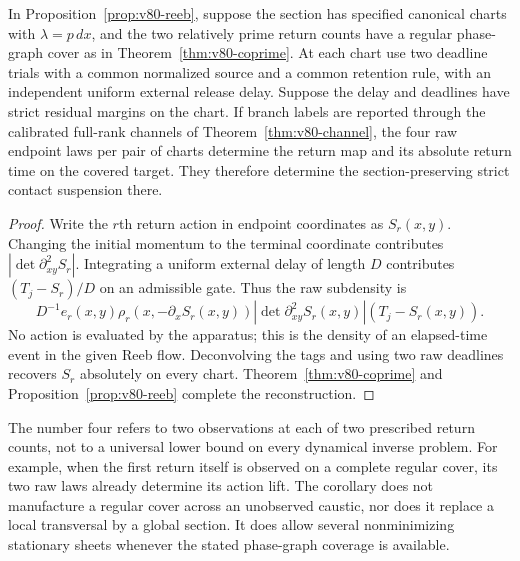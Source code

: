 \begin{corollary}
\label{cor:v80-four-intrinsic}
In Proposition~\ref{prop:v80-reeb}, suppose the section has specified
canonical charts with $\lambda=p\,dx$, and the two relatively prime
return counts have a regular phase-graph cover as in
Theorem~\ref{thm:v80-coprime}.  At each chart use two deadline trials
with a common normalized source and a common retention rule, with an
independent uniform external release delay.  Suppose the delay and
deadlines have strict residual margins on the chart.  If branch labels
are reported through the calibrated full-rank channels of
Theorem~\ref{thm:v80-channel}, the four raw endpoint laws per pair of
charts determine the return map and its absolute return time on the
covered target.  They therefore determine the section-preserving strict
contact suspension there.
\end{corollary}
\begin{proof}
Write the $r$th return action in endpoint coordinates as $S_r(x,y)$.
Changing the initial momentum to the terminal coordinate contributes
$|\det\partial_{xy}^2S_r|$.  Integrating a uniform external delay of
length $D$ contributes $(T_j-S_r)/D$ on an admissible gate.  Thus the
raw subdensity is
\[
 D^{-1}e_r(x,y)\rho_r(x,-\partial_xS_r(x,y))
           |\det\partial_{xy}^2S_r(x,y)|(T_j-S_r(x,y)).
\]
No action is evaluated by the apparatus; this is the density of an
elapsed-time event in the given Reeb flow.  Deconvolving the tags and
using two raw deadlines recovers $S_r$ absolutely on every chart.
Theorem~\ref{thm:v80-coprime} and Proposition~\ref{prop:v80-reeb}
complete the reconstruction.
\end{proof}

The number four refers to two observations at each of two prescribed
return counts, not to a universal lower bound on every dynamical inverse
problem.  For example, when the first return itself is observed on a
complete regular cover, its two raw laws already determine its action
lift.  The corollary does not manufacture a regular cover across an
unobserved caustic, nor does it replace a local transversal by a global
section.  It does allow several nonminimizing stationary sheets whenever
the stated phase-graph coverage is available.
